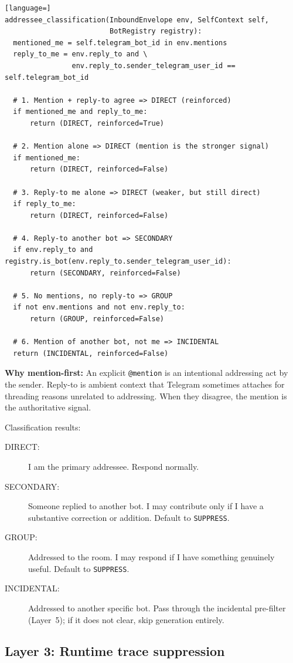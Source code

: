 \documentclass[11pt]{article}
\begin{document}
\begin{lstlisting}[language=]
addressee_classification(InboundEnvelope env, SelfContext self,
                         BotRegistry registry):
  mentioned_me = self.telegram_bot_id in env.mentions
  reply_to_me = env.reply_to and \
                env.reply_to.sender_telegram_user_id == self.telegram_bot_id

  # 1. Mention + reply-to agree => DIRECT (reinforced)
  if mentioned_me and reply_to_me:
      return (DIRECT, reinforced=True)

  # 2. Mention alone => DIRECT (mention is the stronger signal)
  if mentioned_me:
      return (DIRECT, reinforced=False)

  # 3. Reply-to me alone => DIRECT (weaker, but still direct)
  if reply_to_me:
      return (DIRECT, reinforced=False)

  # 4. Reply-to another bot => SECONDARY
  if env.reply_to and registry.is_bot(env.reply_to.sender_telegram_user_id):
      return (SECONDARY, reinforced=False)

  # 5. No mentions, no reply-to => GROUP
  if not env.mentions and not env.reply_to:
      return (GROUP, reinforced=False)

  # 6. Mention of another bot, not me => INCIDENTAL
  return (INCIDENTAL, reinforced=False)
\end{lstlisting}

\textbf{Why mention-first:} An explicit \texttt{@mention} is an intentional
addressing act by the sender.  Reply-to is ambient context that Telegram
sometimes attaches for threading reasons unrelated to addressing.  When they
disagree, the mention is the authoritative signal.

Classification results:
\begin{description}
\item[DIRECT:] I am the primary addressee.  Respond normally.
\item[SECONDARY:] Someone replied to another bot.  I may contribute only if I
have a substantive correction or addition.  Default to \texttt{SUPPRESS}.
\item[GROUP:] Addressed to the room.  I may respond if I have something
genuinely useful.  Default to \texttt{SUPPRESS}.
\item[INCIDENTAL:] Addressed to another specific bot.  Pass through the
incidental pre-filter (Layer~5); if it does not clear, skip generation entirely.
\end{description}

\subsection{Layer 3: Runtime trace suppression}
\end{document}
